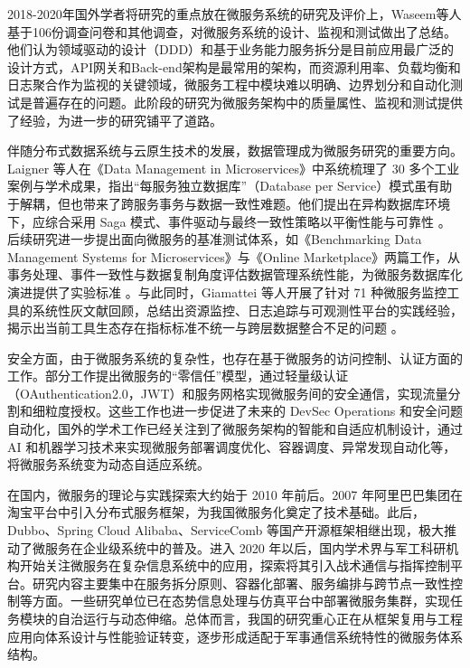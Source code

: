 2018-2020年国外学者将研究的重点放在微服务系统的研究及评价上，Waseem\cite{Waseem2021Design}等人基于106份调查问卷和其他调查，对微服务系统的设计、监视和测试做出了总结。他们认为领域驱动的设计（DDD）和基于业务能力服务拆分是目前应用最广泛的设计方式，API网关和Back-end架构是最常用的架构，而资源利用率、负载均衡和日志聚合作为监视的关键领域，微服务工程中模块难以明确、边界划分和自动化测试是普遍存在的问题。此阶段的研究为微服务架构中的质量属性、监视和测试提供了经验，为进一步的研究铺平了道路。

伴随分布式数据系统与云原生技术的发展，数据管理成为微服务研究的重要方向。Laigner 等人在《Data Management in Microservices》中系统梳理了 30 多个工业案例与学术成果，指出“每服务独立数据库”（Database per Service）模式虽有助于解耦，但也带来了跨服务事务与数据一致性难题。他们提出在异构数据库环境下，应综合采用 Saga 模式、事件驱动与最终一致性策略以平衡性能与可靠性 \cite{Laigner2021Data}。后续研究进一步提出面向微服务的基准测试体系，如《Benchmarking Data Management Systems for Microservices》与《Online Marketplace》两篇工作，从事务处理、事件一致性与数据复制角度评估数据管理系统性能，为微服务数据库化演进提供了实验标准 \cite{BenchmarkingDataMgmt2024,OnlineMarketplace2024}。与此同时，Giamattei 等人开展了针对 71 种微服务监控工具的系统性灰文献回顾，总结出资源监控、日志追踪与可观测性平台的实践经验，揭示出当前工具生态存在指标标准不统一与跨层数据整合不足的问题 \cite{MonitoringTools2023}。

安全方面，由于微服务系统的复杂性，也存在基于微服务的访问控制、认证方面的工作。部分工作提出微服务的“零信任”模型，通过轻量级认证（OAuthentication2.0，JWT）和服务网格实现微服务间的安全通信，实现流量分割和细粒度授权。这些工作也进一步促进了未来的 DevSec Operations 和安全问题自动化，国外的学术工作已经关注到了微服务架构的智能和自适应机制设计，通过 AI 和机器学习技术来实现微服务部署调度优化、容器调度、异常发现自动化等，将微服务系统变为动态自适应系统。

在国内，微服务的理论与实践探索大约始于 2010 年前后。2007 年阿里巴巴集团在淘宝平台中引入分布式服务框架，为我国微服务化奠定了技术基础。此后，Dubbo、Spring Cloud Alibaba、ServiceComb 等国产开源框架相继出现，极大推动了微服务在企业级系统中的普及。进入 2020 年以后，国内学术界与军工科研机构开始关注微服务在复杂信息系统中的应用，探索将其引入战术通信与指挥控制平台。研究内容主要集中在服务拆分原则、容器化部署、服务编排与跨节点一致性控制等方面。一些研究单位已在态势信息处理与仿真平台中部署微服务集群，实现任务模块的自治运行与动态伸缩。总体而言，我国的研究重心正在从框架复用与工程应用向体系设计与性能验证转变，逐步形成适配于军事通信系统特性的微服务体系结构。

